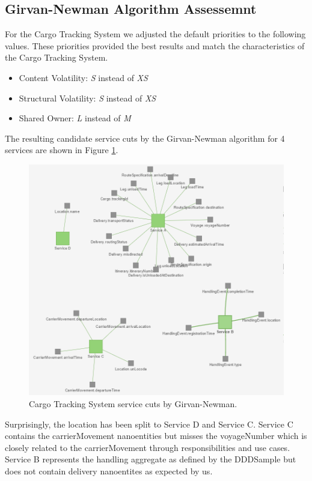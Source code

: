 \subsection{Girvan-Newman Algorithm Assessemnt}

For the Cargo Tracking System we adjusted the default priorities to the following values. These priorities provided the best results and match the characteristics of the Cargo Tracking System.

\begin{itemize}
	\item Content Volatility: \textit{S} instead of \textit{XS}
	\item Structural Volatility: \textit{S} instead of \textit{XS}
	\item Shared Owner: \textit{L} instead of \textit{M}
\end{itemize}

The resulting candidate service cuts by the Girvan-Newman algorithm for 4 services are shown in Figure \ref{fig:dddGirvanNewman}.

\begin{figure}[H]
	\includegraphics[scale=0.7]{images/ddd_girvan_4.png}
	\caption{Cargo Tracking System service cuts by Girvan-Newman.}
	\label{fig:dddGirvanNewman}
\end{figure}

Surprisingly, the location has been split to Service D and Service C. Service C contains the carrierMovement nanoentities but misses the voyageNumber which is closely related to the carrierMovement through responsibilities and use cases. Service B represents the handling aggregate as defined by the DDDSample but does not contain delivery nanoentites as expected by us. 

